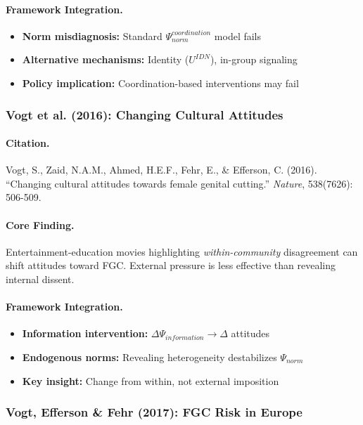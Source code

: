 \documentclass[12pt,a4paper]{article}
\begin{document}
\paragraph{Framework Integration.}
\begin{itemize}
  \item \textbf{Norm misdiagnosis:} Standard $\Psi_{norm}^{coordination}$ model fails
  \item \textbf{Alternative mechanisms:} Identity ($U^{IDN}$), in-group signaling
  \item \textbf{Policy implication:} Coordination-based interventions may fail
\end{itemize}

\subsubsection{Vogt et al. (2016): Changing Cultural Attitudes}

\paragraph{Citation.}
Vogt, S., Zaid, N.A.M., Ahmed, H.E.F., Fehr, E., \& Efferson, C. (2016).
``Changing cultural attitudes towards female genital cutting.''
\emph{Nature}, 538(7626): 506-509.

\paragraph{Core Finding.}
Entertainment-education movies highlighting \emph{within-community}
disagreement can shift attitudes toward FGC. External pressure is
less effective than revealing internal dissent.

\paragraph{Framework Integration.}
\begin{itemize}
  \item \textbf{Information intervention:} $\Delta\Psi_{information} \to \Delta$ attitudes
  \item \textbf{Endogenous norms:} Revealing heterogeneity destabilizes $\Psi_{norm}$
  \item \textbf{Key insight:} Change from within, not external imposition
\end{itemize}

\subsubsection{Vogt, Efferson \& Fehr (2017): FGC Risk in Europe}
\end{document}
